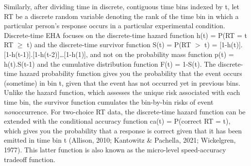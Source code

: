 \documentclass[
  man,floatsintext]{apa6}
\begin{document}
Similarly, after dividing time in discrete, contiguous time bins indexed by t, let RT be a discrete random variable denoting the rank of the time bin in which a particular person's response occurs in a particular experimental condition. Discrete-time EHA focuses on the discrete-time hazard function h(t) = P(RT = t\textbar{} RT \(\geq\) t) and the discrete-time survivor function S(t) = P(RT \(>\) t) = {[}1-h(t){]}.{[}1-h(t-1){]}.{[}1-h(t-2){]}\ldots{[}1-h(1){]}, and not on the probability mass function p(t) = h(t).S(t-1) and the cumulative distribution function F(t) = 1-S(t). The discrete-time hazard probability function gives you the probability that the event occurs (sometime) in bin t, given that the event has not occurred yet in previous bins. Unlike the hazard function, which assesses the unique risk associated with each time bin, the survivor function cumulates the bin-by-bin risks of event \emph{non}occurrence.
For two-choice RT data, the discrete-time hazard function can be extended with the conditional accuracy function ca(t) = P(correct \textbar{} RT = t), which gives you the probability that a response is correct given that it has been emitted in time bin t (Allison, 2010; Kantowitz \& Pachella, 2021; Wickelgren, 1977). This latter function is also known as the micro-level speed-accuracy tradeoff function.
\end{document}
